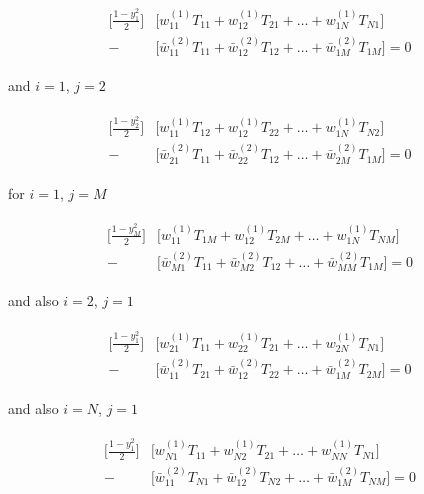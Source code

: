 \begin{align}
\begin{split} \label{DQMApplyExampleDiscretized2}
 \bigg[\frac{1-y_1^2}{2} \bigg] &\bigg[w_{11}^{(1)} T_{11} + w_{12}^{(1)} T_{21} + \dots + w_{1N}^{(1)} T_{N1}\bigg] \\
-  & \bigg[\bar{w}_{11}^{(2)} T_{11} + \bar{w}_{12}^{(2)} T_{12} + \dots + \bar{w}_{1M}^{(2)} T_{1M}\bigg]=0
\end{split}
\end{align}

and $i=1$, $j=2$

\begin{align}
\begin{split} \label{DQMApplyExampleDiscretized2}
\bigg[\frac{1-y_2^2}{2} \bigg]  & \bigg[w_{11}^{(1)} T_{12} + w_{12}^{(1)} T_{22} + \dots + w_{1N}^{(1)} T_{N2}\bigg] \\
-  & \bigg[\bar{w}_{21}^{(2)} T_{11} + \bar{w}_{22}^{(2)} T_{12} + \dots + \bar{w}_{2M}^{(2)} T_{1M}\bigg]=0
\end{split}
\end{align}

for $i=1$, $j=M$

\begin{align}
\begin{split} \label{DQMApplyExampleDiscretized2}
\bigg[\frac{1-y_M^2}{2} \bigg]  & \bigg[w_{11}^{(1)} T_{1M} + w_{12}^{(1)} T_{2M} + \dots + w_{1N}^{(1)} T_{NM}\bigg]\\
-  & \bigg[\bar{w}_{M1}^{(2)} T_{11} + \bar{w}_{M2}^{(2)} T_{12} + \dots + \bar{w}_{MM}^{(2)} T_{1M}\bigg]=0
\end{split}
\end{align}

and also $i=2$, $j=1$

\begin{align}
\begin{split} \label{DQMApplyExampleDiscretized2}
\bigg[\frac{1-y_1^2}{2} \bigg]  & \bigg[w_{21}^{(1)} T_{11} + w_{22}^{(1)} T_{21} + \dots + w_{2N}^{(1)} T_{N1}\bigg] \\
-  & \bigg[\bar{w}_{11}^{(2)} T_{21} + \bar{w}_{12}^{(2)} T_{22} + \dots + \bar{w}_{1M}^{(2)} T_{2M}\bigg]=0
\end{split}
\end{align}

and also $i=N$, $j=1$

\begin{align}
\begin{split} \label{DQMApplyExampleDiscretized2}
\bigg[\frac{1-y_1^2}{2} \bigg]  & \bigg[w_{N1}^{(1)} T_{11} + w_{N2}^{(1)} T_{21} + \dots + w_{NN}^{(1)} T_{N1}\bigg] \\
-  & \bigg[\bar{w}_{11}^{(2)} T_{N1} + \bar{w}_{12}^{(2)} T_{N2} + \dots + \bar{w}_{1M}^{(2)} T_{NM}\bigg]=0
\end{split}
\end{align}

